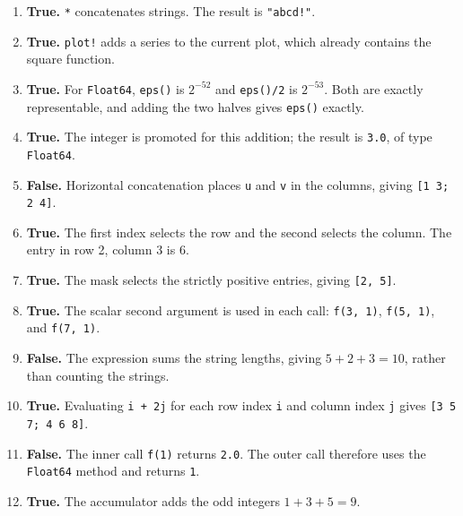 \documentclass[a4paper]{article}
\newcommand{\julia}[1]{\texttt{#1}}
\begin{document}
\begin{enumerate}[itemsep=8pt]
    \item \textbf{True.} \julia{*} concatenates strings.
        The result is \julia{"abcd!"}.

    \item \textbf{True.} \julia{plot!} adds a series to the current plot,
        which already contains the square function.

    \item \textbf{True.} For \julia{Float64}, \julia{eps()} is $2^{-52}$
        and \julia{eps()/2} is $2^{-53}$. Both are exactly representable,
        and adding the two halves gives \julia{eps()} exactly.

    \item \textbf{True.} The integer is promoted for this addition;
        the result is \julia{3.0}, of type \julia{Float64}.

    \item \textbf{False.} Horizontal concatenation places \julia{u} and
        \julia{v} in the columns, giving \julia{[1 3; 2 4]}.

    \item \textbf{True.} The first index selects the row and the second
        selects the column. The entry in row 2, column 3 is 6.

    \item \textbf{True.} The mask selects the strictly positive entries,
        giving \julia{[2, 5]}.

    \item \textbf{True.} The scalar second argument is used in each call:
        \julia{f(3, 1)}, \julia{f(5, 1)}, and \julia{f(7, 1)}.

    \item \textbf{False.} The expression sums the string lengths,
        giving $5+2+3=10$, rather than counting the strings.

    \item \textbf{True.} Evaluating \julia{i + 2j} for each row index
        \julia{i} and column index \julia{j} gives \julia{[3 5 7; 4 6 8]}.

    \item \textbf{False.} The inner call \julia{f(1)} returns \julia{2.0}.
        The outer call therefore uses the \julia{Float64} method and returns \julia{1}.

    \item \textbf{True.} The accumulator adds the odd integers $1+3+5=9$.


\end{enumerate}
\end{document}
